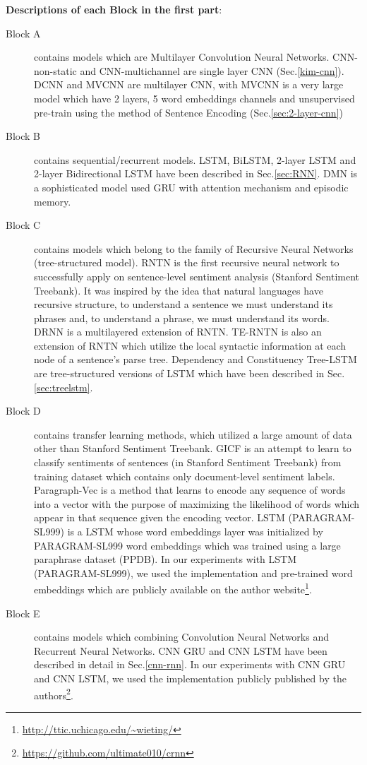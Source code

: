 \textbf{Descriptions of each Block in the first part}:
\begin{description}
\item[Block A] contains models which are Multilayer Convolution Neural Networks.  
CNN-non-static and CNN-multichannel\cite{KimCNN} are single layer CNN (Sec.\ref{kim-cnn}).
DCNN\cite{DCNN} and MVCNN\cite{2-layer-cnn} are multilayer CNN, with MVCNN is a very large model  which have 2 layers, 5 word embeddings channels and unsupervised pre-train using the method of Sentence Encoding (Sec.\ref{sec:2-layer-cnn})
\item[Block B] contains sequential/recurrent models. 
 LSTM\cite{originLSTM}, BiLSTM\cite{GravesLSTM}, 2-layer LSTM\cite{GravesLSTM} and 2-layer Bidirectional LSTM\cite{GravesLSTM} have been described in Sec.\ref{sec:RNN}.
DMN\cite{attention-gru} is a sophisticated model used GRU with attention mechanism and episodic memory.
\item[Block C] contains models which belong to the family of Recursive Neural Networks (tree-structured model). 
RNTN\cite{socher2013recursive} is the first recursive neural network to successfully apply on sentence-level sentiment analysis (Stanford Sentiment Treebank). 
It was inspired by the idea that natural languages have recursive structure, to understand a sentence we must understand its phrases and, to understand a phrase, we must understand its words. 
DRNN\cite{IrsoyDRNN} is a multilayered extension of RNTN.
TE-RNTN is also an extension of RNTN which utilize the local syntactic information at each node of a sentence's parse tree.
Dependency and Constituency Tree-LSTM\cite{treeLSTM} are tree-structured versions of LSTM which have been described in Sec.\ref{sec:treelstm}.
 
\item[Block D] contains transfer learning methods, which utilized a large amount of data other than Stanford Sentiment Treebank.
GICF\cite{group-instance} is an attempt to learn to classify sentiments of sentences (in Stanford Sentiment Treebank) from training dataset which contains only document-level sentiment labels.
Paragraph-Vec\cite{ParagraphVec} is a method that learns to encode any sequence of words into a vector with the purpose of maximizing the likelihood of words which appear in that sequence given the encoding vector.
LSTM (PARAGRAM-SL999)\cite{wieting2015towards} is a LSTM whose word embeddings layer was initialized by PARAGRAM-SL999 word embeddings which was trained using a large paraphrase dataset (PPDB\cite{ganitkevitch2013ppdb}).
In our experiments with LSTM (PARAGRAM-SL999), we used the implementation and pre-trained word embeddings which are publicly available on the author website\footnote{\url{http://ttic.uchicago.edu/~wieting/}}.
 
\item[Block E] contains models which combining Convolution Neural Networks and Recurrent Neural Networks. 
CNN GRU and CNN LSTM\cite{cnn-rnn} have been described in detail in Sec.\ref{cnn-rnn}. 
In our experiments with CNN GRU and CNN LSTM, we used the implementation publicly published by the authors\footnote{\url{https://github.com/ultimate010/crnn}}.
\end{description} 

